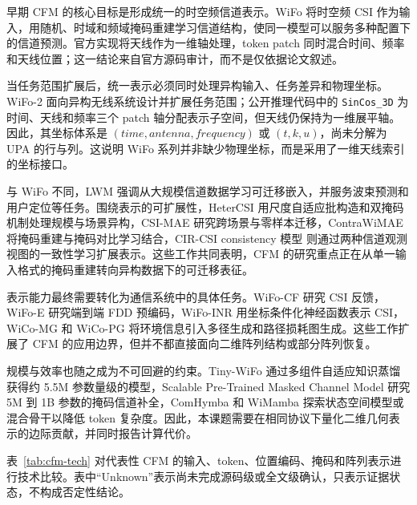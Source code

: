 \documentclass[journal]{IEEEtran}
\begin{document}
早期 CFM 的核心目标是形成统一的时空频信道表示。WiFo \cite{liu2025wifo} 将时空频 CSI 作为输入，用随机、时域和频域掩码重建学习信道结构，使同一模型可以服务多种配置下的信道预测。官方实现将天线作为一维轴处理，token patch 同时混合时间、频率和天线位置；这一结论来自官方源码审计，而不是仅依据论文叙述。

当任务范围扩展后，统一表示必须同时处理异构输入、任务差异和物理坐标。WiFo-2 \cite{liu2026wifo2} 面向异构无线系统设计并扩展任务范围；公开推理代码中的 \texttt{SinCos\_3D} 为时间、天线和频率三个 patch 轴分配表示子空间，但天线仍保持为一维展平轴。因此，其坐标体系是 \((time, antenna, frequency)\) 或 \((t,k,u)\)，尚未分解为 UPA 的行与列。这说明 WiFo 系列并非缺少物理坐标，而是采用了一维天线索引的坐标接口。

与 WiFo 不同，LWM \cite{alikhani2024lwm} 强调从大规模信道数据学习可迁移嵌入，并服务波束预测和用户定位等任务。围绕表示的可扩展性，HeterCSI \cite{jiang2026hetercsi} 用尺度自适应批构造和双掩码机制处理规模与场景异构，CSI-MAE \cite{jiang2026csimae} 研究跨场景与零样本迁移，ContraWiMAE \cite{guler2026contrawimae} 将掩码重建与掩码对比学习结合，CIR-CSI consistency 模型 \cite{jiang2025circsi,jiang2026csiclip} 则通过两种信道观测视图的一致性学习扩展表示。这些工作共同表明，CFM 的研究重点正在从单一输入格式的掩码重建转向异构数据下的可迁移表征。

表示能力最终需要转化为通信系统中的具体任务。WiFo-CF \cite{liu2026wifocf} 研究 CSI 反馈，WiFo-E \cite{wen2026wifoe} 研究端到端 FDD 预编码，WiFo-INR \cite{liu2026wifoinr} 用坐标条件化神经函数表示 CSI，WiCo-MG \cite{han2026wicomeg} 和 WiCo-PG \cite{sun2026wicopg} 将环境信息引入多径生成和路径损耗图生成。这些工作扩展了 CFM 的应用边界，但并不都直接面向二维阵列结构或部分阵列恢复。

规模与效率也随之成为不可回避的约束。Tiny-WiFo \cite{zhang2026tinywifo} 通过多组件自适应知识蒸馏获得约 5.5M 参数量级的模型，Scalable Pre-Trained Masked Channel Model \cite{guo2026scalable} 研究 5M 到 1B 参数的掩码信道补全，ComHymba \cite{yang2026comhymba} 和 WiMamba \cite{raviv2026wimamba} 探索状态空间模型或混合骨干以降低 token 复杂度。因此，本课题需要在相同协议下量化二维几何表示的边际贡献，并同时报告计算代价。

表~\ref{tab:cfm-tech} 对代表性 CFM 的输入、token、位置编码、掩码和阵列表示进行技术比较。表中“Unknown”表示尚未完成源码级或全文级确认，只表示证据状态，不构成否定性结论。
\end{document}
